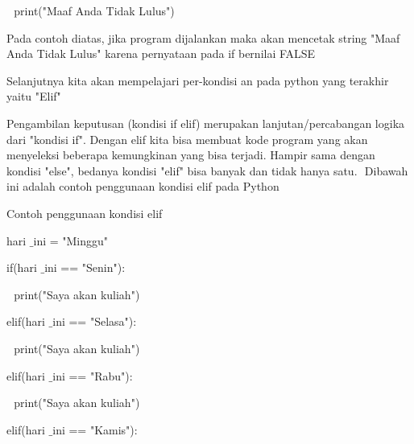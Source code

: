  $  $  $  $ print("Maaf Anda Tidak Lulus") \par
\noindent 
\vspace{\baselineskip}
\vspace{\baselineskip}
Pada contoh diatas, jika program dijalankan maka akan mencetak string "Maaf Anda Tidak Lulus" karena pernyataan pada if bernilai FALSE \par
\noindent 
\vspace{\baselineskip}
Selanjutnya kita akan mempelajari per-kondisi an pada python yang terakhir yaitu "Elif" $  $ \par
\vspace{12pt}
\noindent 
Pengambilan keputusan (kondisi if elif) merupakan lanjutan/percabangan logika dari "kondisi if". Dengan elif kita bisa membuat kode program yang akan menyeleksi beberapa kemungkinan yang bisa terjadi. Hampir sama dengan kondisi "else", bedanya kondisi "elif" bisa banyak dan tidak hanya satu. $  $\vspace{\baselineskip}
\vspace{\baselineskip}
Dibawah ini adalah contoh penggunaan kondisi elif pada Python \par
\vspace{12pt}
\noindent 
Contoh penggunaan kondisi elif \par
\vspace{12pt}
\noindent 
hari $  \_  $ini = "Minggu" \par
\noindent 
\vspace{\baselineskip}
\vspace{\baselineskip}
if(hari $  \_  $ini == "Senin"): \par
\noindent 
\vspace{\baselineskip}
 $  $  $  $ print("Saya akan kuliah") \par
\noindent 
\vspace{\baselineskip}
elif(hari $  \_  $ini == "Selasa"): \par
\noindent 
\vspace{\baselineskip}
 $  $  $  $ print("Saya akan kuliah") \par
\noindent 
\vspace{\baselineskip}
elif(hari $  \_  $ini == "Rabu"): \par
\noindent 
\vspace{\baselineskip}
 $  $  $  $ print("Saya akan kuliah") \par
\noindent 
\vspace{\baselineskip}
elif(hari $  \_  $ini == "Kamis"): \par
